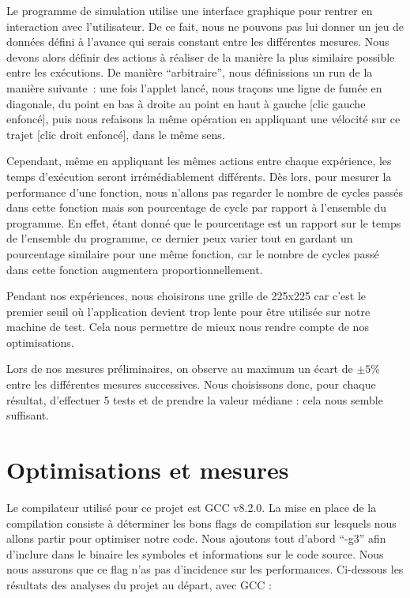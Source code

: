 \documentclass[12pt,a4paper]{article}
\begin{document}
Le programme de simulation utilise une interface graphique pour rentrer en
interaction avec l’utilisateur. De ce fait, nous ne pouvons pas lui donner un
jeu de données défini à l’avance qui serais constant entre les différentes
mesures. Nous devons alors définir des actions à réaliser de la manière la plus
similaire possible entre les exécutions. De manière \enquote{arbitraire}, nous
définissions un run de la manière suivante : une fois l’applet lancé, nous
traçons une ligne de fumée en diagonale, du point en bas à droite au point en
haut à gauche [clic gauche enfoncé], puis nous refaisons la même opération en
appliquant une vélocité sur ce trajet [clic droit enfoncé], dans le même sens.

Cependant, même en appliquant les mêmes actions entre chaque expérience, les
temps d’exécution seront irrémédiablement différents. Dès lors, pour mesurer la
performance d’une fonction, nous n’allons pas regarder le nombre de cycles
passés dans cette fonction mais son pourcentage de cycle par rapport à
l’ensemble du programme. En effet, étant donné que le pourcentage est un rapport
sur le temps de l’ensemble du programme, ce dernier peux varier tout en gardant
un pourcentage similaire pour une même fonction, car le nombre de cycles passé
dans cette fonction augmentera proportionnellement.

Pendant nos expériences, nous choisirons une grille de 225x225 car c’est le
premier seuil où l’application devient trop lente pour être utilisée sur notre
machine de test. Cela nous permettre de mieux nous rendre compte de nos
optimisations.

Lors de nos mesures préliminaires, on observe au maximum un écart de $\pm 5 \%$
entre les différentes mesures successives. Nous choisissons donc, pour chaque
résultat, d’effectuer 5 tests et de prendre la valeur médiane : cela nous semble
suffisant.

\section{Optimisations et mesures}
\label{sec.optim}

Le compilateur utilisé pour ce projet est \ac{GCC} v8.2.0. La mise en place de
la compilation consiste à déterminer les bons flags de compilation sur lesquels
nous allons partir pour optimiser notre code. Nous ajoutons tout d’abord
\enquote{-g3} afin d’inclure dans le binaire les symboles et informations sur le
code source. Nous nous assurons que ce flag n’as pas d’incidence sur les
performances. Ci-dessous les résultats des analyses du projet au départ, avec
\ac{GCC} :
\end{document}

